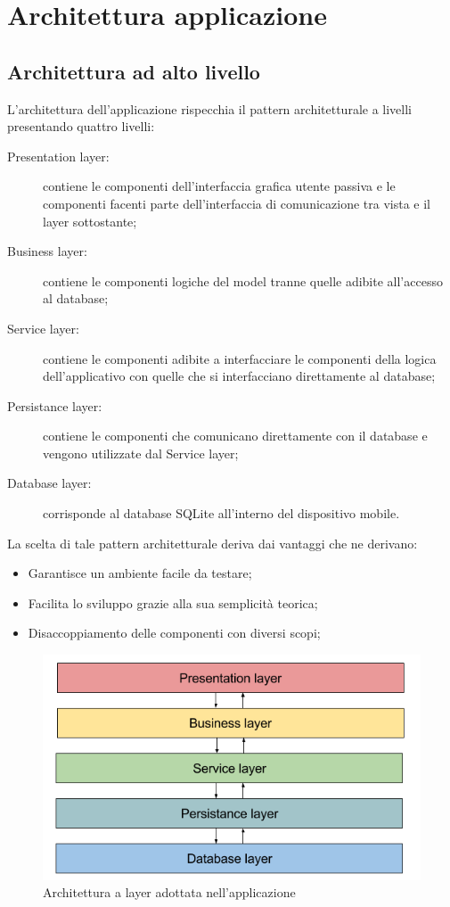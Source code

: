\documentclass[../DefinizioneDiProdotto.tex]{subfiles}
\begin{document}
\section{Architettura applicazione}

	\subsection{Architettura ad alto livello}
		L'architettura dell'applicazione rispecchia il pattern architetturale a livelli presentando quattro livelli:
		\begin{description}
			\item[Presentation layer:] contiene le componenti dell'interfaccia grafica utente passiva e le componenti facenti parte dell'interfaccia di comunicazione tra vista e il layer sottostante;
			\item[Business layer:] contiene le componenti logiche del model tranne quelle adibite all'accesso al database;
			\item[Service layer:] contiene le componenti adibite a interfacciare le componenti della logica dell'applicativo con quelle che si interfacciano direttamente al database;
			\item[Persistance layer:] contiene le componenti che comunicano direttamente con il database e vengono utilizzate dal Service layer; 
			\item[Database layer:] corrisponde al database SQLite all'interno del dispositivo mobile.
		\end{description}
	La scelta di tale pattern architetturale deriva dai vantaggi che ne derivano:
	\begin{itemize}
		\item Garantisce un ambiente facile da testare;
		\item Facilita lo sviluppo grazie alla sua semplicità teorica;
		\item Disaccoppiamento delle componenti con diversi scopi;
	\end{itemize}
	
	\begin{figure} [h]
		\centering
		\includegraphics[scale=0.4]{img/LayeredArchitecture}
		\caption{Architettura a layer adottata nell'applicazione}
		\label{fig:LayerArchitecture}
	\end{figure}
		
\end{document}
